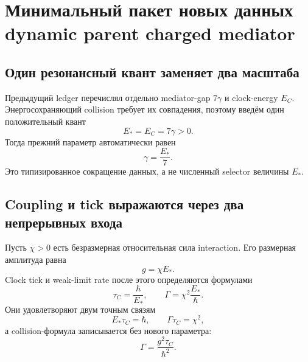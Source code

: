 \chapter{Минимальный пакет новых данных dynamic parent charged mediator}
\label{ch:v8-charged-mediator-minimal-new-data}

\section{Один резонансный квант заменяет два масштаба}

Предыдущий ledger перечислял отдельно mediator-gap $7\gamma$ и clock-energy
$E_C$. Энергосохраняющий collision требует их совпадения, поэтому введём
один положительный квант
\begin{equation}
 E_*=E_C=7\gamma>0.
 \label{eq:v8-mediator-min-data-common-energy}
\end{equation}
Тогда прежний параметр автоматически равен
\begin{equation}
 \gamma=\frac{E_*}{7}.
 \label{eq:v8-mediator-min-data-gamma}
\end{equation}
Это типизированное сокращение данных, а не численный selector величины
$E_*$.

\section{Coupling и tick выражаются через два непрерывных входа}

Пусть $\chi>0$ есть безразмерная относительная сила interaction. Его
размерная амплитуда равна
\begin{equation}
 g=\chi E_*.
 \label{eq:v8-mediator-min-data-coupling}
\end{equation}
Clock tick и weak-limit rate после этого определяются формулами
\begin{equation}
 \tau_C=\frac{\hbar}{E_*},
 \qquad
 \Gamma=\chi^2\frac{E_*}{\hbar}.
 \label{eq:v8-mediator-min-data-tick-rate}
\end{equation}
Они удовлетворяют двум точным связям
\begin{equation}
 E_*\tau_C=\hbar,
 \qquad \Gamma\tau_C=\chi^2,
 \label{eq:v8-mediator-min-data-relations}
\end{equation}
а collision-формула записывается без нового параметра:
\begin{equation}
 \Gamma=\frac{g^2\tau_C}{\hbar^2}.
 \label{eq:v8-mediator-min-data-collision-rate}
\end{equation}

